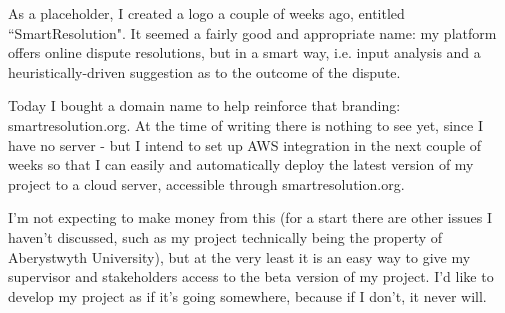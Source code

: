 As a placeholder, I created a logo a couple of weeks ago, entitled ``SmartResolution". It seemed a fairly good and appropriate name: my platform offers online dispute resolutions, but in a smart way, i.e. input analysis and a heuristically-driven suggestion as to the outcome of the dispute.

Today I bought a domain name to help reinforce that branding: smartresolution.org. At the time of writing there is nothing to see yet, since I have no server - but I intend to set up AWS integration in the next couple of weeks so that I can easily and automatically deploy the latest version of my project to a cloud server, accessible through smartresolution.org.

I'm not expecting to make money from this (for a start there are other issues I haven't discussed, such as my project technically being the property of Aberystwyth University), but at the very least it is an easy way to give my supervisor and stakeholders access to the beta version of my project. I'd like to develop my project as if it's going somewhere, because if I don't, it never will.